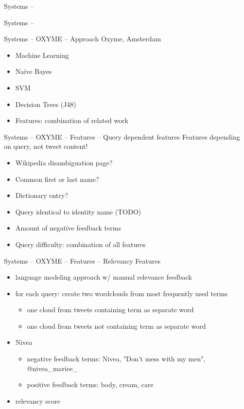 \documentclass[12pt,a4paper]{beamer}
\begin{document}
\begin{frame}{Systems -- }

\end{frame}


\begin{frame}{Systems -- }

\end{frame}



\begin{frame}{Systems -- OXYME -- Approach}
Oxyme, Amsterdam
\begin{itemize}
\item Machine Learning
\item Naive Bayes
\item SVM
\item Decision Trees (J48)
\item Features: combination of related work
\end{itemize}

\end{frame}

\begin{frame}{Systems -- OXYME -- Features -- Query dependent features}
Features depending on query, not tweet content!
\begin{itemize}
\item Wikipedia disambiguation page?
\item Common first or last name?
\item Dictionary entry?
\item Query identical to identity name (TODO)
\item Amount of negative feedback terms
\item Query difficulty: combination of all features
\end{itemize}

\end{frame}


\begin{frame}{Systems -- OXYME -- Features -- Relevancy Features}
\begin{itemize}
\item language modeling approach w/ manual relevance feedback
\item for each query: create two wordclouds from most frequently used terms
  \begin{itemize}
  \item one cloud from tweets containing term as separate word
  \item one cloud from tweets not containing term as separate word
  \end{itemize}
\item Nivea
  \begin{itemize}
  \item negative feedback terms: Nivea, "Don't mess with my men", @nivea\_mariee\_
  \item positive feedback terms: body, cream, care
  \end{itemize}
\item relevancy score
\end{itemize}

\end{frame}
\end{document}
